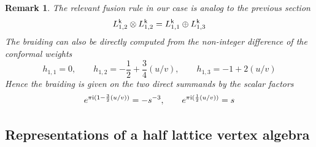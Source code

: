 \documentclass[a4paper, reqno]{amsart}
\newtheorem{remark}[theorem]{Remark}
\theoremstyle{introTheorems}
\renewcommand{\1}{\mathbbold{1}}
\begin{document}
\begin{remark}
The relevant fusion rule in our case is analog to the previous section 
\[L^{\mathsf{k}}_{1,2}
\otimes L^{\mathsf{k}}_{1,2}
=L^{\mathsf{k}}_{1,1}
\oplus L^{\mathsf{k}}_{1,3}
\]
The braiding can also be directly computed from the non-integer difference of the conformal weights
\[h_{1,1}=0,\qquad 
h_{1,2}=-\frac{1}{2}+\frac{3}{4}(u/v),\qquad 
h_{1,3}=-1+2(u/v)\]
Hence the braiding is given on the two direct summands by the scalar factors 
\[ e^{\pi\mathrm{i}(1-\frac{3}{2}(u/v))}=-s^{-3},\qquad
e^{\pi\mathrm{i}(\frac{1}{2}(u/v))}=s
\]
\end{remark}


\subsection{Representations  of a half lattice vertex algebra}
\label{subsec:CartanLattice}
\end{document}
